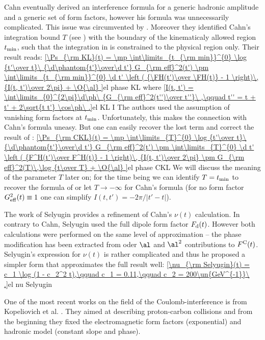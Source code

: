 Cahn eventually derived an interference formula for a generic hadronic amplitude and a generic set of form factors, however his formula was unnecessarily complicated. This issue was circumvented by \KaL{} . Moreover they identified Cahn's integration bound $T$ (see ) with the boundary of the kinematicaly allowed region $t_{\rm min}$, such that the integration in  is constrained to the physical region only. Their result reads:
\eqref{\Ps_{\rm KL}(t) =
	\mp \int\limits_{t_{\rm min}}^{0} \log {t'\over t}\ {\d\phantom{t'}\over\d t'} G_{\rm eff}^2(t')
	\pm \int\limits_{t_{\rm min}}^{0} \d t' \left ( {\FH(t')\over \FH(t)} - 1 \right)\, {I(t, t')\over 2\pi}
	+ \O{\al}
}{el phase KL}
where
\eqref{I(t, t') = \int\limits_{0}^{2\pi}\d\ph\ {G_{\rm eff}^2(t'')\over t''}\ ,\qquad t'' = t + t' + 2\sqrt{t t'} \cos\ph\ .}{el KL I}
The authors used the assumption of vanishing form factors at $t_{\rm min}$. Unfortunately, this makes the connection with Cahn's formula  uneasy. But one can easily recover the lost term and correct the result of \KL{}:
\eqref{\Ps_{\rm CKL}(t) =
	\mp \int\limits_{T}^{0} \log {t'\over t}\ {\d\phantom{t'}\over\d t'} G_{\rm eff}^2(t')
	\pm \int\limits_{T}^{0} \d t' \left ( {F^H(t')\over F^H(t)} - 1 \right)\, {I(t, t')\over 2\pi}
	\pm G_{\rm eff}^2(T)\,\log {t\over T}
	+ \O{\al}
}{el phase CKL}
We will discuss the meaning of the parameter $T$ later on; for the time being we can identify $T = t_{\rm min}$ to recover the formula of \KL{} or let $T\to -\infty$ for Cahn's formula (for no form factor $G_{\rm eff}^2(t) \equiv 1$ one can simplify $I(t, t') = -2\pi / |t' - t|$).

The work of Selyugin  provides a refinement of Cahn's $\nu(t)$ calculation. In contrary to Cahn, Selyugin used the full dipole form factor $F_{\rm d}(t)$. However both calculations were performed on the same level of approximation -- the phase modification has been extracted from oder $\al$ and $\al^2$ contributions to $F^{\rm C}(t)$. Selyugin's expression for $\nu(t)$ is rather complicated and thus he proposed a simpler form that approximates the full result well:
\eqref{\nu_{\rm Selyugin}(t) = c_1 \log (1 - c_2^2 t),\qquad c_1 = 0.11,\qquad c_2 = 200\un{GeV^{-1}}\ .}{el nu Selyugin}

One of the most recent works on the field of the Coulomb-interference is from Kopeliovich et al. . They aimed at describing proton-carbon collisions and from the beginning they fixed the electromagnetic form factors (exponential) and hadronic model (constant slope and phase).

